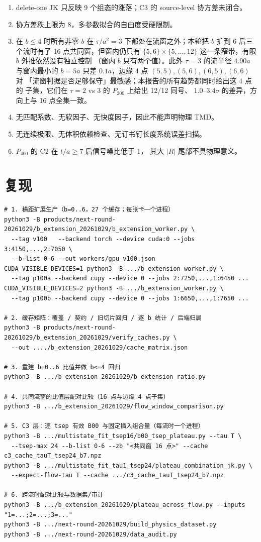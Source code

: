 \documentclass[UTF8,a4paper,11pt]{ctexart}
\begin{document}
\begin{enumerate}
  \item delete-one JK 只反映 9 个组态的涨落；C3 的 source-level 协方差未闭合。
  \item 协方差秩上限为 8，多参数拟合的自由度受硬限制。
  \item 在 $b\le4$ 时所有非零 $b$ 在 $\tau/a^2=3$ 下都处在流窗之外；本轮把
        $b$ 扩到 6 后三个流时有了 16 点共同窗，但窗内仍只有 $\{5,6\}\times
        \{5,\dots,12\}$ 这一条窄带，有限 $b$ 外推依然没有独立控制
        （窗内 $b$ 只有两个值）。此外 $\tau=3$ 的流半径 $4.90a$ 与窗内最小的
        $b=5a$ 只差 $0.1a$，边缘 4 点 $(5,5),(5,6),(6,5),(6,6)$ 对
        「流窗判据是否足够保守」最敏感；本报告的所有趋势都同时给出这 4 点的
        子集，它们在 $\tau=2$ vs $3$ 的 $P_{200}$ 上给出 12/12 同号、
        $1.0$--$3.4\sigma$ 的差异，方向上与 16 点全集一致。
  \item 无匹配系数、无软因子、无快度因子，因此不能声明物理 TMD。
  \item 无连续极限、无体积依赖检查、无订书钉长度系统误差扫描。
  \item $P_{400}$ 的 C2 在 $t/a\ge7$ 后信号噪比低于 1，
        其大 $|R|$ 尾部不具物理意义。
\end{enumerate}

\section{复现}

\begin{lstlisting}
# 1. 横距扩展生产（b=0..6，27 个缓存；每张卡一个进程）
python3 -B products/next-round-20261029/b_extension_20261029/b_extension_worker.py \
  --tag v100   --backend torch --device cuda:0 --jobs 3:4150,...,2:7050 \
  --b-list 0-6 --out workers/gpu_v100.json
CUDA_VISIBLE_DEVICES=1 python3 -B .../b_extension_worker.py \
  --tag p100a --backend cupy --device 0 --jobs 2:7250,...,1:6450 ...
CUDA_VISIBLE_DEVICES=2 python3 -B .../b_extension_worker.py \
  --tag p100b --backend cupy --device 0 --jobs 1:6650,...,1:7650 ...

# 2. 缓存矩阵：覆盖 / 契约 / 旧切片回归 / 逐 b 统计 / 后端归属
python3 -B products/next-round-20261029/b_extension_20261029/verify_caches.py \
  --out ..../b_extension_20261029/cache_matrix.json

# 3. 重建 b=0..6 比值并做 b<=4 回归
python3 -B .../b_extension_20261029/b_extension_ratio.py

# 4. 共同流窗的比值层配对比较（16 点与边缘 4 点子集）
python3 -B .../b_extension_20261029/flow_window_comparison.py

# 5. C3 层：逐 tsep 有效 B00 与固定插入组合量（每流时一个进程）
python3 -B .../multistate_fit_tsep16/b00_tsep_plateau.py --tau T \
  --tsep-max 24 --b-list 0-6 --zb "<共同窗 16 点>" --cache c3_cache_tauT_tsep24_b7.npz
python3 -B .../multistate_fit_tau1_tsep24/plateau_combination_jk.py \
  --expect-flow-tau T --cache .../c3_cache_tauT_tsep24_b7.npz

# 6. 跨流时配对比较与数据集/审计
python3 -B .../b_extension_20261029/plateau_across_flow.py --inputs "1=...;2=...;3=..."
python3 -B .../next-round-20261029/build_physics_dataset.py
python3 -B .../next-round-20261029/data_audit.py
\end{lstlisting}
\end{document}
